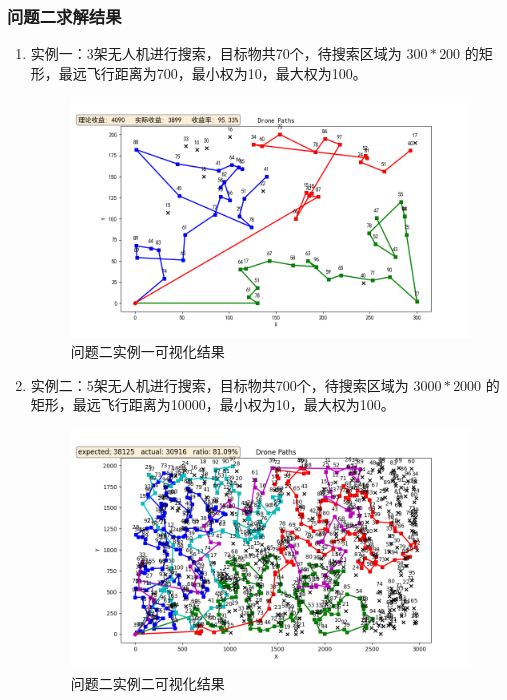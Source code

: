 \documentclass[bwprint]{gmcmthesis}
\numberwithin{figure}{section}
\begin{document}
\subsubsection{问题二求解结果}
\begin{enumerate}
	\item 实例一：3架无人机进行搜索，目标物共70个，待搜索区域为 $ 300*200 $ 的矩形，最远飞行距离为700，最小权为10，最大权为100。
	
	\begin{figure}[h]
		\centering
		\includegraphics[width=\textwidth]{../assets/img/5.png}  %
		\caption{问题二实例一可视化结果}
	\end{figure}
	
	\item 实例二：5架无人机进行搜索，目标物共700个，待搜索区域为 $ 3000*2000 $ 的矩形，最远飞行距离为10000，最小权为10，最大权为100。
	
	\begin{figure}[h]
		\centering
		\includegraphics[width=\textwidth]{../assets/img/6.png}  %
		\caption{问题二实例二可视化结果}
	\end{figure}


\end{enumerate}
\end{document}
